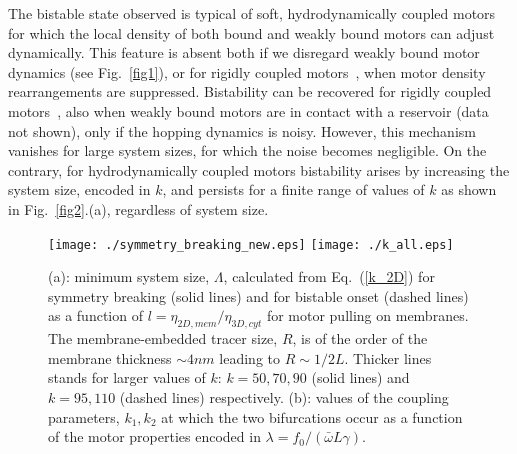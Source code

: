 \documentclass[prl,aps,twocolumn, floatfix, superscriptaddress,showpacs]{revtex4}
\begin{document}
The bistable state  observed is typical of soft, hydrodynamically coupled motors for which the local density of both bound and weakly bound motors can adjust dynamically. %
This feature is absent both if  we disregard weakly bound motor dynamics (see Fig.~\ref{fig1}), or for rigidly coupled motors~\cite{Guerin2011},  when motor density rearrangements are suppressed. Bistability can be recovered  for  rigidly coupled motors~\cite{Guerin2011}, also when weakly bound motors are in contact with a reservoir (data not shown), only if the hopping dynamics is noisy. However, this mechanism vanishes for large system sizes, for which the noise becomes negligible. On the contrary, for hydrodynamically coupled motors  bistability arises by increasing the system size, encoded in $k$, and persists for a finite range of values of $k$ as shown in Fig.~\ref{fig2}.(a), regardless of system size.
\begin{figure}
 \texttt{[image: ./symmetry\_breaking\_new.eps]}
 \texttt{[image: ./k\_all.eps]}
\caption{(a): minimum system size, $\Lambda$, calculated from Eq.~(\ref{k_2D}) for symmetry breaking (solid lines) and for bistable onset (dashed lines) as a function of $l=\eta_{2D,mem}/\eta_{3D,cyt}$ for motor pulling on membranes. The membrane-embedded tracer size, $R$, is of the order of the membrane thickness $\sim 4 nm$ leading to  $R\sim 1/2 L$. Thicker lines stands for larger values of $k$: $k=50,70,90$ (solid lines) and $k=95,110$ (dashed lines) respectively. (b): values of the coupling parameters, $k_1,k_2$ at which the two bifurcations occur as a function of the motor properties encoded in $\lambda=f_0/(\bar{\omega} L \gamma)$.}
\label{symmetry_breaking}
\end{figure}
\end{document}
